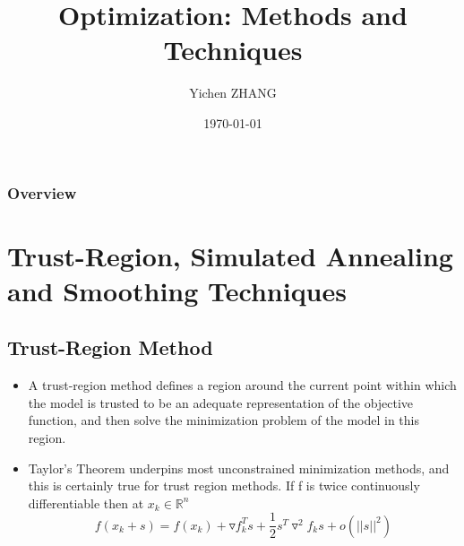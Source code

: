 \documentclass[hyperref={pdfpagelabels=false}]{beamer}
\title[Optimization: Methods and Techniques]{Optimization: Methods and Techniques} %
\author{Yichen ZHANG} %
\institute[uWaterloo] %
{
University of Waterloo \\ %
\medskip
\textit{yichen.zhang@uwaterloo.ca} %
}
\date{\today} %
\begin{document}
\begin{frame}
\titlepage %
\end{frame}

\begin{frame}
\frametitle{Overview} %
\tableofcontents %
\end{frame}

\section{Trust-Region, Simulated Annealing and Smoothing Techniques}
\subsection{Trust-Region Method}


\begin{frame}
\begin{itemize}
\frametitle{Trust-Region Method}
\item A trust-region method defines a region around the current point within which the model is trusted to be an adequate representation of the objective function, and then solve the minimization problem of the model in this region.
\item Taylor's Theorem underpins most unconstrained minimization methods, and this is certainly true for trust region methods. If f is twice continuously differentiable then at $x_k\in \mathbb{R}^n$
\begin{equation}
f(x_k+s)=f(x_k)+\triangledown f_k^Ts+\frac{1}{2}s^T\triangledown ^2f_ks+o(||s||^2)
\end{equation}
\end{itemize}
\end{frame}
\end{document}

